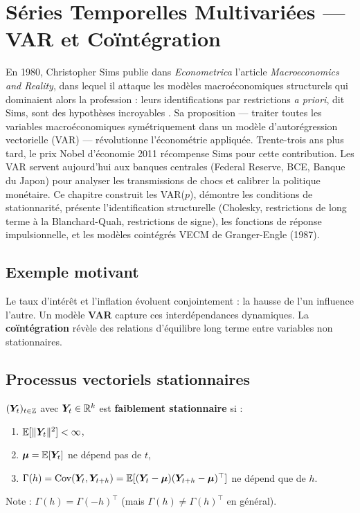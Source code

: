 \chapter{S\'eries Temporelles Multivari\'ees --- VAR et Co\"int\'egration}
\label{ch:var}

En 1980, Christopher Sims publie dans \emph{Econometrica} l'article \emph{Macroeconomics and Reality}, dans lequel il attaque les modèles macroéconomiques structurels qui dominaient alors la profession : leurs identifications par restrictions \emph{a priori}, dit Sims, sont des hypothèses \og incroyables \fg{}. Sa proposition --- traiter toutes les variables macroéconomiques symétriquement dans un modèle d'autorégression vectorielle (VAR) --- révolutionne l'économétrie appliquée. Trente-trois ans plus tard, le prix Nobel d'économie 2011 récompense Sims pour cette contribution. Les VAR servent aujourd'hui aux banques centrales (Federal Reserve, BCE, Banque du Japon) pour analyser les transmissions de chocs et calibrer la politique monétaire. Ce chapitre construit les VAR($p$), démontre les conditions de stationnarité, présente l'identification structurelle (Cholesky, restrictions de long terme à la Blanchard-Quah, restrictions de signe), les fonctions de réponse impulsionnelle, et les modèles cointégrés VECM de Granger-Engle (1987).

\section{Exemple motivant}
Le taux d'int\'er\^et et l'inflation \'evoluent conjointement : la hausse de l'un influence l'autre. Un mod\`ele \textbf{VAR} capture ces interd\'ependances dynamiques. La \textbf{co\"int\'egration} r\'ev\`ele des relations d'\'equilibre long terme entre variables non stationnaires.

\section{Processus vectoriels stationnaires}

\begin{definition}
$(\bm{Y}_t)_{t\in\mathbb{Z}}$ avec $\bm{Y}_t\in\mathbb{R}^k$ est \textbf{faiblement stationnaire} si :
\begin{enumerate}
\item $\mathbb{E}[\|\bm{Y}_t\|^2]<\infty$,
\item $\bm\mu = \mathbb{E}[\bm{Y}_t]$ ne d\'epend pas de $t$,
\item $\Gamma(h) = \operatorname{Cov}(\bm{Y}_t,\bm{Y}_{t+h}) = \mathbb{E}[(\bm{Y}_t-\bm\mu)(\bm{Y}_{t+h}-\bm\mu)^\top]$ ne d\'epend que de $h$.
\end{enumerate}
Note : $\Gamma(h)=\Gamma(-h)^\top$ (mais $\Gamma(h)\neq\Gamma(h)^\top$ en g\'en\'eral).
\end{definition}

